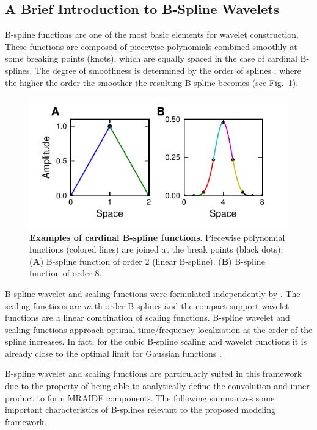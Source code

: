 \documentclass[review,authoryear,3p]{elsarticle}
\begin{document}
\subsection{A Brief Introduction to B-Spline Wavelets}
B-spline functions are one of the most basic elements for wavelet construction. These functions are composed of piecewise polynomials combined smoothly at some breaking points (knots), which are equally spaced in the case of cardinal B-splines. The degree of smoothness is determined by the order of splines \citep{Goswami1999}, where the higher the order the smoother the resulting B-spline becomes (see Fig.~\ref{fig:Figure0}).
\begin{figure}[!t]
\centering
\includegraphics{./Graph/fig3.pdf}
\caption{{\bf Examples of cardinal B-spline functions}. Piecewise polynomial functions (colored lines) are joined at the break points (black dots). (\textbf{A}) B-spline function of order 2 (linear B-spline). (\textbf{B}) B-spline function of order 8.}
\label{fig:Figure0}
\end{figure}
 
B-spline wavelet and scaling functions were formulated independently by \citet{Chui1992b,Chui1992,Unser1993}.  The scaling functions are $m$-th order B-splines and the compact support wavelet functions are a linear combination of scaling functions. B-spline wavelet and scaling functions approach optimal time/frequency localization as the order of the spline increases. In fact, for the cubic B-spline scaling and wavelet functions it is already close to the optimal limit for Gaussian functions \citep{Unser1999}. 

B-spline wavelet and scaling functions are particularly suited in this framework due to the property of being able to analytically define the convolution and inner product to form MRAIDE components. The following summarizes some important characteristics of B-splines relevant to the proposed modeling framework. 
\end{document}
